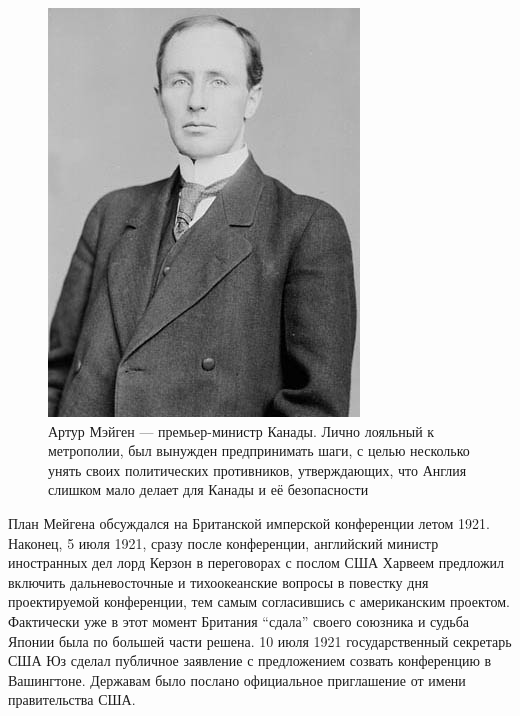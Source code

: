 \begin{figure}[h!tb] 
	\centering\includegraphics[scale=0.8]{Glava6/ePnbL90bYbw.jpg}
	\caption{Артур Мэйген — премьер-министр Канады. Лично лояльный к метрополии, был вынужден предпринимать шаги, с целью несколько унять своих политических противников, утверждающих, что Англия слишком мало делает для Канады и её безопасности}%
\end{figure}

План Мейгена обсуждался на Британской имперской конференции летом 1921. Наконец, 5 июля 1921, сразу после конференции, английский министр иностранных дел лорд Керзон в переговорах с послом США Харвеем предложил включить дальневосточные и тихоокеанские вопросы в повестку дня проектируемой конференции, тем самым согласившись с американским проектом. Фактически уже в этот момент Британия “сдала” своего союзника и судьба Японии была по большей части решена. 10 июля 1921 государственный секретарь США Юз сделал публичное заявление с предложением созвать конференцию в Вашингтоне. Державам было послано официальное приглашение от имени правительства США.

